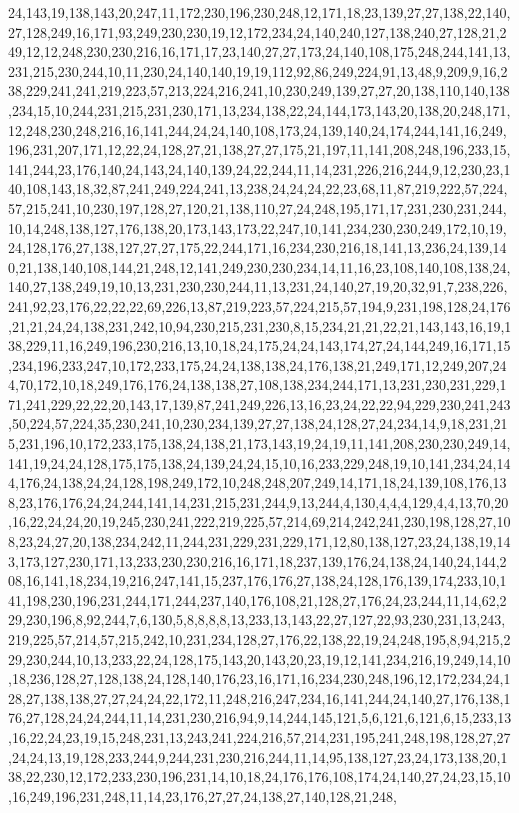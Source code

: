 24,143,19,138,143,20,247,11,172,230,196,230,248,12,171,18,23,139,27,27,138,22,140,27,128,249,16,171,93,249,230,230,19,12,172,234,24,140,240,127,138,240,27,128,21,249,12,12,248,230,230,216,16,171,17,23,140,27,27,173,24,140,108,175,248,244,141,13,231,215,230,244,10,11,230,24,140,140,19,19,112,92,86,249,224,91,13,48,9,209,9,16,238,229,241,241,219,223,57,213,224,216,241,10,230,249,139,27,27,20,138,110,140,138,234,15,10,244,231,215,231,230,171,13,234,138,22,24,144,173,143,20,138,20,248,171,12,248,230,248,216,16,141,244,24,24,140,108,173,24,139,140,24,174,244,141,16,249,196,231,207,171,12,22,24,128,27,21,138,27,27,175,21,197,11,141,208,248,196,233,15,141,244,23,176,140,24,143,24,140,139,24,22,244,11,14,231,226,216,244,9,12,230,23,140,108,143,18,32,87,241,249,224,241,13,238,24,24,24,22,23,68,11,87,219,222,57,224,57,215,241,10,230,197,128,27,120,21,138,110,27,24,248,195,171,17,231,230,231,244,10,14,248,138,127,176,138,20,173,143,173,22,247,10,141,234,230,230,249,172,10,19,24,128,176,27,138,127,27,27,175,22,244,171,16,234,230,216,18,141,13,236,24,139,140,21,138,140,108,144,21,248,12,141,249,230,230,234,14,11,16,23,108,140,108,138,24,140,27,138,249,19,10,13,231,230,230,244,11,13,231,24,140,27,19,20,32,91,7,238,226,241,92,23,176,22,22,22,69,226,13,87,219,223,57,224,215,57,194,9,231,198,128,24,176,21,21,24,24,138,231,242,10,94,230,215,231,230,8,15,234,21,21,22,21,143,143,16,19,138,229,11,16,249,196,230,216,13,10,18,24,175,24,24,143,174,27,24,144,249,16,171,15,234,196,233,247,10,172,233,175,24,24,138,138,24,176,138,21,249,171,12,249,207,244,70,172,10,18,249,176,176,24,138,138,27,108,138,234,244,171,13,231,230,231,229,171,241,229,22,22,20,143,17,139,87,241,249,226,13,16,23,24,22,22,94,229,230,241,243,50,224,57,224,35,230,241,10,230,234,139,27,27,138,24,128,27,24,234,14,9,18,231,215,231,196,10,172,233,175,138,24,138,21,173,143,19,24,19,11,141,208,230,230,249,14,141,19,24,24,128,175,175,138,24,139,24,24,15,10,16,233,229,248,19,10,141,234,24,144,176,24,138,24,24,128,198,249,172,10,248,248,207,249,14,171,18,24,139,108,176,138,23,176,176,24,24,244,141,14,231,215,231,244,9,13,244,4,130,4,4,4,129,4,4,13,70,20,16,22,24,24,20,19,245,230,241,222,219,225,57,214,69,214,242,241,230,198,128,27,108,23,24,27,20,138,234,242,11,244,231,229,231,229,171,12,80,138,127,23,24,138,19,143,173,127,230,171,13,233,230,230,216,16,171,18,237,139,176,24,138,24,140,24,144,208,16,141,18,234,19,216,247,141,15,237,176,176,27,138,24,128,176,139,174,233,10,141,198,230,196,231,244,171,244,237,140,176,108,21,128,27,176,24,23,244,11,14,62,229,230,196,8,92,244,7,6,130,5,8,8,8,8,13,233,13,143,22,27,127,22,93,230,231,13,243,219,225,57,214,57,215,242,10,231,234,128,27,176,22,138,22,19,24,248,195,8,94,215,229,230,244,10,13,233,22,24,128,175,143,20,143,20,23,19,12,141,234,216,19,249,14,10,18,236,128,27,128,138,24,128,140,176,23,16,171,16,234,230,248,196,12,172,234,24,128,27,138,138,27,27,24,24,22,172,11,248,216,247,234,16,141,244,24,140,27,176,138,176,27,128,24,24,244,11,14,231,230,216,94,9,14,244,145,121,5,6,121,6,121,6,15,233,13,16,22,24,23,19,15,248,231,13,243,241,224,216,57,214,231,195,241,248,198,128,27,27,24,24,13,19,128,233,244,9,244,231,230,216,244,11,14,95,138,127,23,24,173,138,20,138,22,230,12,172,233,230,196,231,14,10,18,24,176,176,108,174,24,140,27,24,23,15,10,16,249,196,231,248,11,14,23,176,27,27,24,138,27,140,128,21,248,